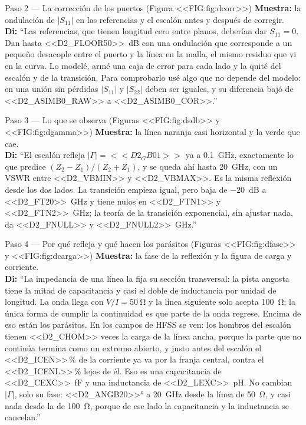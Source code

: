 \documentclass[11pt,letterpaper]{article}
\begin{document}
\begin{paso}{Paso 2 --- La corrección de los puertos (Figura <<FIG:fig:dcorr>>)}
\textbf{Muestra:} la ondulación de $|S_{11}|$ en las referencias y el escalón antes y después de corregir.\\
\textbf{Di:} ``Las referencias, que tienen longitud cero entre planos, deberían dar $S_{11}=0$. Dan hasta \SI{<<D2_FLOOR50>>}{dB} con una ondulación que corresponde a un pequeño desacople entre el puerto y la línea en la malla, el mismo residuo que vi en la curva. Lo modelé, armé una caja de error para cada lado y la quité del escalón y de la transición. Para comprobarlo usé algo que no depende del modelo: en una unión sin pérdidas $|S_{11}|$ y $|S_{22}|$ deben ser iguales, y su diferencia bajó de <<D2_ASIMB0_RAW>> a <<D2_ASIMB0_COR>>.''
\end{paso}

\begin{paso}{Paso 3 --- Lo que se observa (Figuras <<FIG:fig:dsdb>> y <<FIG:fig:dgamma>>)}
\textbf{Muestra:} la línea naranja casi horizontal y la verde que cae.\\
\textbf{Di:} ``El escalón refleja $|\Gamma|=<<D2_GB01>>$ ya a \SI{0.1}{GHz}, exactamente lo que predice $(Z_2-Z_1)/(Z_2+Z_1)$, y se queda ahí hasta \SI{20}{GHz}, con un VSWR entre <<D2_VBMIN>> y <<D2_VBMAX>>. Es la misma reflexión desde los dos lados. La transición empieza igual, pero baja de $-20$~dB a \SI{<<D2_FT20>>}{GHz} y tiene nulos en \SI{<<D2_FTN1>>}{} y \SI{<<D2_FTN2>>}{GHz}; la teoría de la transición exponencial, sin ajustar nada, da \SI{<<D2_FNULL>>}{} y \SI{<<D2_FNULL2>>}{GHz}.''
\end{paso}

\begin{paso}{Paso 4 --- Por qué refleja y qué hacen los parásitos (Figuras <<FIG:fig:dfase>> y <<FIG:fig:dcarga>>)}
\textbf{Muestra:} la fase de la reflexión y la figura de carga y corriente.\\
\textbf{Di:} ``La impedancia de una línea la fija su sección transversal: la pista angosta tiene la mitad de capacitancia y casi el doble de inductancia por unidad de longitud. La onda llega con $V/I=\SI{50}{\ohm}$ y la línea siguiente solo acepta \SI{100}{\ohm}; la única forma de cumplir la continuidad es que parte de la onda regrese. Encima de eso están los parásitos. En los campos de HFSS se ven: los hombros del escalón tienen <<D2_CHOM>> veces la carga de la línea ancha, porque la parte que no continúa termina como un extremo abierto, y justo antes del escalón el <<D2_ICEN>>\,\% de la corriente ya va por la franja central, contra el <<D2_ICENL>>\,\% lejos de él. Eso es una capacitancia de \SI{<<D2_CEXC>>}{fF} y una inductancia de \SI{<<D2_LEXC>>}{pH}. No cambian $|\Gamma|$, solo su fase: \ang{<<D2_ANGB20>>} a \SI{20}{GHz} desde la línea de \SI{50}{\ohm}, y casi nada desde la de \SI{100}{\ohm}, porque de ese lado la capacitancia y la inductancia se cancelan.''
\end{paso}
\end{document}
